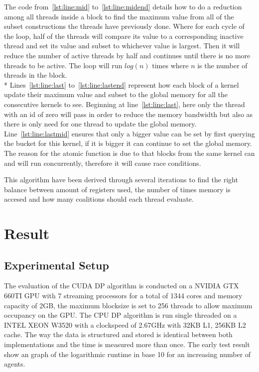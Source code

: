 \documentclass[a4paper, 12pt]{report}
\begin{document}
The code from~\ref{lst:line:mid} to~\ref{lst:line:midend} details how to do a reduction among all threads inside a block to find the maximum value from all of the subset constructions the threads have previously done. Where for each cycle of the loop, half of the threads will compare its value to a corresponding inactive thread and set its value and subset to whichever value is largest. Then it will reduce the number of active threads by half and continues until there is no more threads to be active. The loop will run $log(n)$ times where $n$ is the number of threads in the block.\\* Lines~\ref{lst:line:last} to~\ref{lst:line:lastend} represent how each block of a kernel update their maximum value and subset to the global memory for all the consecutive kernels to see. Beginning at line~\ref{lst:line:last}, here only the thread with an id of zero will pass in order to reduce the memory bandwidth but also as there is only need for one thread to update the global memory. Line~\ref{lst:line:lastmid} ensures that 
only a bigger value can be set by first querying the bucket for this kernel, if it is bigger it can continue to set the global memory. The reason for the atomic function is due to that blocks from the same kernel can and will run concurrently, therefore it will cause race conditions.

This algorithm have been derived through several iterations to find the right balance between amount of registers used, the number of times memory is accesed and how many coalitions should each thread evaluate. 
\section{Result}
\subsection{Experimental Setup}
The evaluation of the CUDA DP algorithm is conducted on a NVIDIA GTX 660TI GPU with 7 streaming processors for a total of 1344 cores and memory capacity of 2GB, the maximum blocksize is set to 256 threads to allow maximum occupancy on the GPU. The CPU DP algorithm is run single threaded on a INTEL XEON W3520 with a clockspeed of 2.67GHz with 32KB L1, 256KB L2 cache. The way the data is structured and stored is identical between both implementations and the time is measured more than once. The early test result show an graph of the logarithmic runtime in base 10 for an increasing number of agents.
\end{document}
